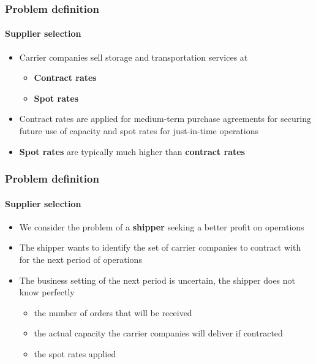\documentclass[9pt,xcolor={dvipsnames}]{beamer}
\begin{document}
\begin{frame}%
	\frametitle{Problem definition}
	\framesubtitle{Supplier selection}
	\begin{itemize}
		\item<1-> Carrier companies sell storage and transportation services at
		\bigskip
		\begin{itemize}
			\item<1-> \textbf{Contract rates}
			\medskip
			\item<2-> \textbf{Spot rates}
		\end{itemize}
		\bigskip
		\item<3-> Contract rates are applied for medium-term purchase agreements for securing future use of capacity and spot rates for just-in-time operations
		\bigskip
		\item<4-> \textbf{\color{purple} Spot rates} are typically much higher than \textbf{\color{blue} contract rates}
	\end{itemize}
\end{frame}

\begin{frame}%
	\frametitle{Problem definition}
	\framesubtitle{Supplier selection}
	\begin{itemize}
		\item<1-> We consider the problem of a \textbf{shipper} seeking a better profit on operations 
		\bigskip
		\item<2-> The shipper wants to identify the set of carrier companies to contract with for the next period of operations
		\bigskip
		\item<3-> The business setting of the next period is uncertain, the shipper does not know perfectly
		\bigskip
		\begin{itemize}
			\item<3-> the number of orders that will be received
			\bigskip
			\item<4-> the actual capacity the carrier companies will deliver if contracted
			\bigskip
			\item<5-> the spot rates applied
		\end{itemize}
	\end{itemize}
\end{frame}
\end{document}
